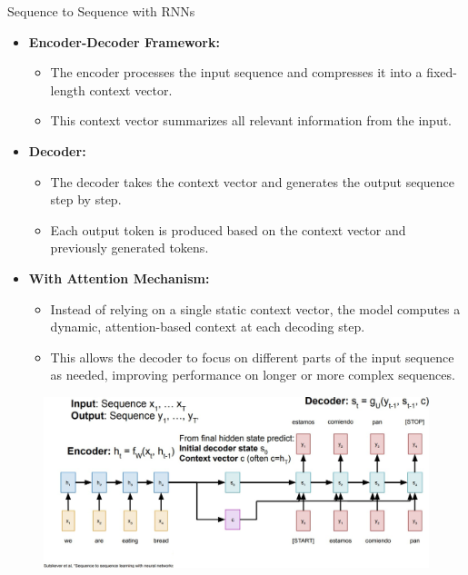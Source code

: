 \begin{frame}[allowframebreaks]{Sequence to Sequence with RNNs}
    \begin{itemize}
        \item \textbf{Encoder-Decoder Framework:}
        \begin{itemize}
            \setlength{\itemsep}{-0.5em}
            \item The encoder processes the input sequence and compresses it into a fixed-length context vector.
            \item This context vector summarizes all relevant information from the input.
        \end{itemize}
        \item \textbf{Decoder:}
        \begin{itemize}
            \setlength{\itemsep}{-0.5em}
            \item The decoder takes the context vector and generates the output sequence step by step.
            \item Each output token is produced based on the context vector and previously generated tokens.
        \end{itemize}
        \item \textbf{With Attention Mechanism:}
        \begin{itemize}
            \setlength{\itemsep}{-0.5em}
            \item Instead of relying on a single static context vector, the model computes a dynamic, attention-based context at each decoding step.
            \item This allows the decoder to focus on different parts of the input sequence as needed, improving performance on longer or more complex sequences.
        \end{itemize}
    \end{itemize}

    \framebreak

    \begin{figure}
        \centering
        \includegraphics[width=1.05\textwidth,keepaspectratio]{images/rnn/slide_10_1_img.jpg}
    \end{figure}


\end{frame}
